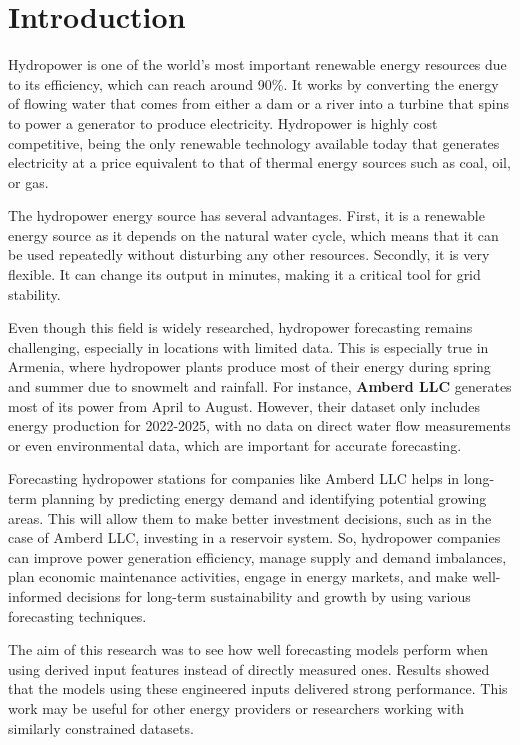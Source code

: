 \documentclass[12pt]{article}
\begin{document}
\newpage


\section{Introduction}
\label{sec:Introduction}

Hydropower is one of the world's most important renewable energy resources due to its efficiency, which can reach around 90\%. It works by converting the energy of flowing water that comes from either a dam or a river into a turbine that spins to power a generator to produce electricity. Hydropower is highly cost competitive, being the only renewable technology available today that generates electricity at a price equivalent to that of thermal energy sources such as coal, oil, or gas.

The hydropower energy source has several advantages. First, it is a renewable energy source as it depends on the natural water cycle, which means that it can be used repeatedly without disturbing any other resources. Secondly, it is very flexible. It can change its output in minutes, making it a critical tool for grid stability.

Even though this field is widely researched, hydropower forecasting remains challenging, especially in locations with limited data. This is especially true in Armenia, where hydropower plants produce most of their energy during spring and summer due to snowmelt and rainfall. For instance, \textbf{Amberd LLC} generates most of its power from April to August. However, their dataset only includes energy production for 2022-2025, with no data on direct water flow measurements or even environmental data, which are important for accurate forecasting.

Forecasting hydropower stations for companies like Amberd LLC helps in long-term planning by predicting energy demand and identifying potential growing areas. This will allow them to make better investment decisions, such as in the case of Amberd LLC, investing in a reservoir system. So, hydropower companies can improve power generation efficiency, manage supply and demand imbalances, plan economic maintenance activities, engage in energy markets, and make well-informed decisions for long-term sustainability and growth by using various forecasting techniques.

The aim of this research was to see how well forecasting models perform when using derived input features instead of directly measured ones. Results showed that the models using these engineered inputs delivered strong performance. This work may be useful for other energy providers or researchers working with similarly constrained datasets.
\end{document}
